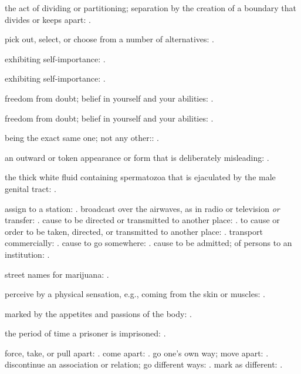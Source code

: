   the act of dividing or partitioning; separation by the creation of a boundary that divides or keeps apart: .

  pick out, select, or choose from a number of alternatives: .

  exhibiting self-importance: .

  exhibiting self-importance: .

  freedom from doubt; belief in yourself and your abilities: .

  freedom from doubt; belief in yourself and your abilities: .

  being the exact same one; not any other:: .

  an outward or token appearance or form that is deliberately misleading: .

  the thick white fluid containing spermatozoa that is ejaculated by the male genital tract: .

  assign to a station: . broadcast over the airwaves, as in radio or television \textit{or} transfer: . cause to be directed or transmitted to another place: . to cause or order to be taken, directed, or transmitted to another place: . transport commercially: . cause to go somewhere: . cause to be admitted; of persons to an institution: .

  street names for marijuana: .

  perceive by a physical sensation, e.g., coming from the skin or muscles: .

  marked by the appetites and passions of the body: .

  the period of time a prisoner is imprisoned: .

  force, take, or pull apart: . come apart: . go one's own way; move apart: . discontinue an association or relation; go different ways: . mark as different: .

